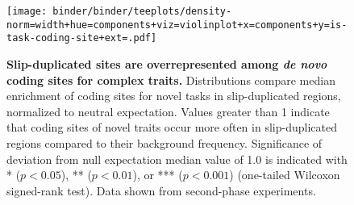 \begin{figure}
\texttt{[image: binder/binder/teeplots/density-norm=width+hue=components+viz=violinplot+x=components+y=is-task-coding-site+ext=.pdf]}
\caption{%
  \textbf{Slip-duplicated sites are overrepresented among \textit{de novo} coding sites for complex traits.}
  \footnotesize
  Distributions compare median enrichment of coding sites for novel tasks in slip-duplicated regions, normalized to neutral expectation.
  Values greater than 1 indicate that coding sites of novel traits occur more often in slip-duplicated regions compared to their background frequency.
  Significance of deviation from null expectation median value of 1.0 is indicated with * ($p < 0.05$), ** ($p < 0.01$), or *** ($p < 0.001$) (one-tailed Wilcoxon signed-rank test).
  Data shown from second-phase experiments.
} \label{fig:potentiation}
\end{figure}

